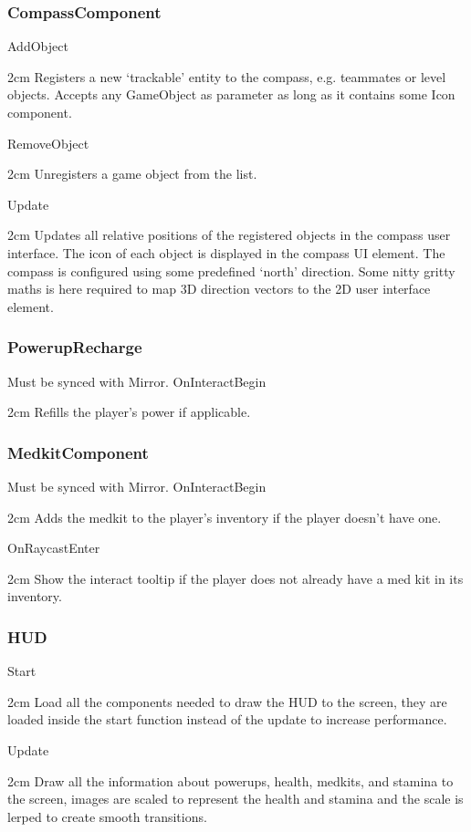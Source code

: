 \documentclass[11pt]{article}
\newenvironment{indentall}{\begin{adjustwidth}{2cm}{}}{\end{adjustwidth}}
\begin{document}
\subsubsection{CompassComponent}
AddObject
\begin{indentall}
Registers a new ‘trackable’ entity to the compass, e.g. teammates or level objects. Accepts any GameObject as parameter as long as it contains some Icon component.
\end{indentall}
RemoveObject
\begin{indentall}
Unregisters a game object from the list.
\end{indentall}
Update
\begin{indentall}
Updates all relative positions of the registered objects in the compass user interface. The icon of each object is displayed in the compass UI element. The compass is configured using some predefined ‘north’ direction. Some nitty gritty maths is here required to map 3D direction vectors to the 2D user interface element.
\end{indentall}

\subsubsection{PowerupRecharge}
Must be synced with Mirror.
\newline
\newline OnInteractBegin
\begin{indentall}
Refills the player’s power if applicable.
\end{indentall}

\subsubsection{MedkitComponent}
Must be synced with Mirror.
\newline
\newline OnInteractBegin
\begin{indentall}
Adds the medkit to the player’s inventory if the player doesn’t have one.
\end{indentall}
OnRaycastEnter
\begin{indentall}
Show the interact tooltip if the player does not already have a med kit in its inventory.
\end{indentall}

\subsubsection{HUD}
Start
\begin{indentall}
Load all the components needed to draw the HUD to the screen, they are loaded inside the start function instead of the update to increase performance.
\end{indentall}
Update
\begin{indentall}
Draw all the information about powerups, health, medkits, and stamina to the screen, images are scaled to represent the health and stamina and the scale is lerped to create smooth transitions.	
\end{indentall}
\end{document}
